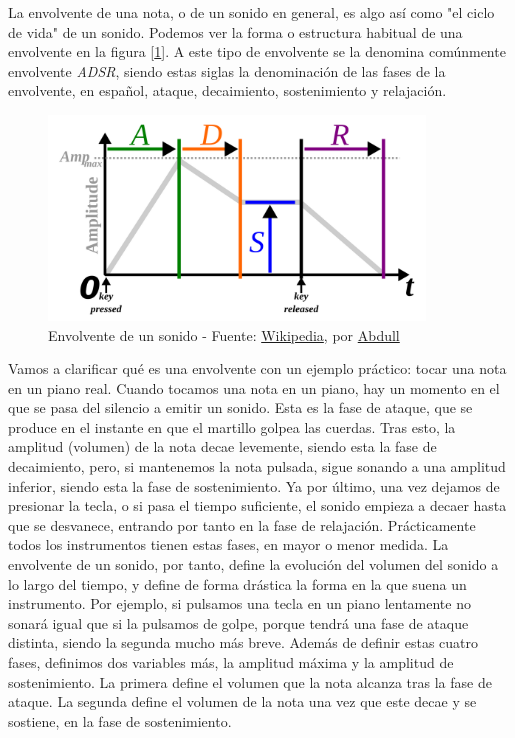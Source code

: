 La envolvente de una nota, o de un sonido en general, es algo así como "el ciclo de vida" de un sonido. Podemos ver la forma o estructura habitual de una envolvente en la figura [\ref{fig:ADSR}]. A este tipo de envolvente se la denomina comúnmente envolvente \emph{ADSR}, siendo estas siglas la denominación de las fases de la envolvente, en español, ataque, decaimiento, sostenimiento y relajación.\\

\begin{figure}[h]
	\centering
	\includegraphics[width=10cm]{archivos/ADSR}
	\caption{Envolvente de un sonido - Fuente: \href{https://en.wikipedia.org/wiki/Envelope_(music)\#/media/File:ADSR_parameter.svg}{Wikipedia}, por \href{https://commons.wikimedia.org/wiki/User:Abdull}{Abdull}}
	\label{fig:ADSR}
\end{figure}

Vamos a clarificar qué es una envolvente con un ejemplo práctico: tocar una nota en un piano real. Cuando tocamos una nota en un piano, hay un momento en el que se pasa del silencio a emitir un sonido. Esta es la fase de ataque, que se produce en el instante en que el martillo golpea las cuerdas. Tras esto, la amplitud (volumen) de la nota decae levemente, siendo esta la fase de decaimiento, pero, si mantenemos la nota pulsada, sigue sonando a una amplitud inferior, siendo esta la fase de sostenimiento. Ya por último, una vez dejamos de presionar la tecla, o si pasa el tiempo suficiente, el sonido empieza a decaer hasta que se desvanece, entrando por tanto en la fase de relajación. Prácticamente todos los instrumentos tienen estas fases, en mayor o menor medida. La envolvente de un sonido, por tanto, define la evolución del volumen del sonido a lo largo del tiempo, y define de forma drástica la forma en la que suena un instrumento. Por ejemplo, si pulsamos una tecla en un piano lentamente no sonará igual que si la pulsamos de golpe, porque tendrá una fase de ataque distinta, siendo la segunda mucho más breve. Además de definir estas cuatro fases, definimos dos variables más, la amplitud máxima y la amplitud de sostenimiento. La primera define el volumen que la nota alcanza tras la fase de ataque. La segunda define el volumen de la nota una vez que este decae y se sostiene, en la fase de sostenimiento.\\


